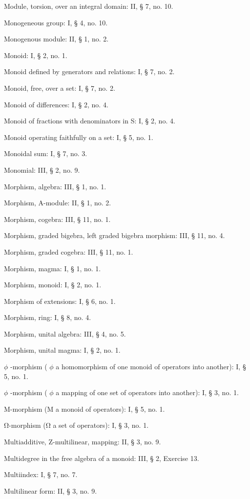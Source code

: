 Module, torsion, over an integral domain: II, § 7, no. 10.

Monogeneous group: I, § 4, no. 10.

Monogenous module: II, § 1, no. 2.

Monoid: I, § 2, no. 1.

Monoid defined by generators and relations: I, § 7, no. 2.

Monoid, free, over a set: I, § 7, no. 2.

Monoid of differences: I, § 2, no. 4.

Monoid of fractions with denominators in S: I, § 2, no. 4.

Monoid operating faithfully on a set: I, § 5, no. 1.

Monoidal sum: I, § 7, no. 3.

Monomial: III, § 2, no. 9.

Morphism, algebra: III, § 1, no. 1.

Morphism, A-module: II, § 1, no. 2.

Morphism, cogebra: III, § 11, no. 1.

Morphism, graded bigebra, left graded bigebra morphism: III, § 11, no. 4.

Morphism, graded cogebra: III, § 11, no. 1.

Morphism, magma: I, § 1, no. 1.

Morphism, monoid: I, § 2, no. 1.

Morphism of extensions: I, § 6, no. 1.

Morphism, ring: I, § 8, no. 4.

Morphism, unital algebra: III, § 4, no. 5.

Morphism, unital magma: I, § 2, no. 1.

\(\phi\) -morphism ( \(\phi\) a homomorphism of one monoid of operators into another): I, § 5, no. 1.

\(\phi\) -morphism ( \(\phi\) a mapping of one set of operators into another): I, § 3, no. 1.

M-morphism (M a monoid of operators): I, § 5, no. 1.

Ω-morphism (Ω a set of operators): I, § 3, no. 1.

Multiadditive, Z-multilinear, mapping: II, § 3, no. 9.

Multidegree in the free algebra of a monoid: III, § 2, Exercise 13.

Multiindex: I, § 7, no. 7.

Multilinear form: II, § 3, no. 9.

